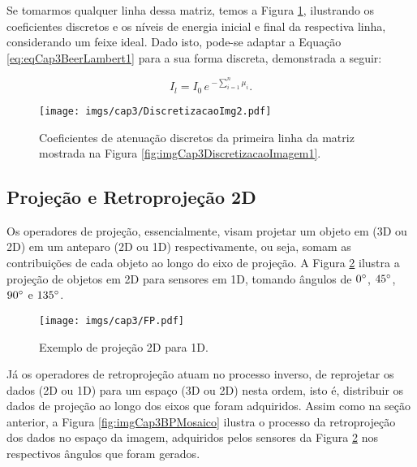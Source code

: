 Se tomarmos qualquer linha dessa matriz, temos a Figura \ref{fig:imgCap3DiscretizacaoImagem2}, ilustrando os coeficientes discretos e os níveis de energia inicial e final da respectiva linha, considerando um feixe ideal. Dado isto, pode-se adaptar a Equação \ref{eq:eqCap3BeerLambert1} para a sua forma discreta, demonstrada a seguir:

\begin{equation}
I_{l} = I_{0} \, e \, ^{-\sum_{i=1}^{n} \mu_{i}}.
\label{eq:eqCap3BeerLambertDiscreto1}
\end{equation} 

\begin{figure}[H]
	\caption{Coeficientes de atenuação discretos da primeira linha da matriz mostrada na Figura \ref{fig:imgCap3DiscretizacaoImagem1}.}
	\begin{center}
		\texttt{[image: imgs/cap3/DiscretizacaoImg2.pdf]}
	\end{center}
	\label{fig:imgCap3DiscretizacaoImagem2}
\end{figure}

\subsection{Projeção e Retroprojeção 2D}

 Os operadores de projeção, essencialmente, visam projetar um objeto em (\acs{3D} ou \acs{2D}) em um anteparo (\acs{2D} ou \acs{1D}) respectivamente, ou seja, somam as contribuições de cada objeto ao longo do eixo de projeção. A Figura \ref{fig:imgCap3ProjeçãoDireta} ilustra a projeção de objetos em \acs{2D} para sensores em \acs{1D}, tomando ângulos de $0\degree$, $45\degree$, $90\degree$ e $135\degree$. 

\begin{figure}[H]
	\caption{Exemplo de projeção \acs{2D} para \acs{1D}.}
	\begin{center}
		\texttt{[image: imgs/cap3/FP.pdf]}
	\end{center}
	\label{fig:imgCap3ProjeçãoDireta}
\end{figure}


Já os operadores de retroprojeção atuam no processo inverso, de reprojetar os dados (\acs{2D} ou \acs{1D}) para um espaço (\acs{3D} ou \acs{2D}) nesta ordem, isto é, distribuir os dados de projeção ao longo dos eixos que foram adquiridos. Assim como na seção anterior, a Figura \ref{fig:imgCap3BPMosaico} ilustra o processo da retroprojeção dos dados no espaço da imagem, adquiridos pelos sensores da Figura \ref{fig:imgCap3ProjeçãoDireta} nos respectivos ângulos que foram gerados. 


